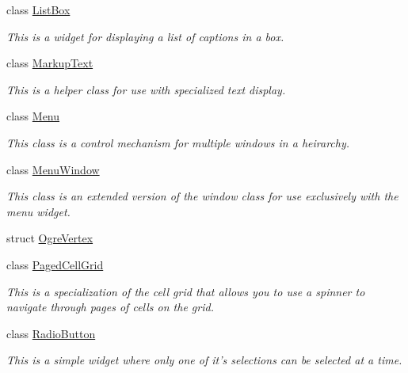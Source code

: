 \begin{DoxyCompactItemize}
class \hyperlink{classMezzanine_1_1UI_1_1ListBox}{ListBox}
\begin{DoxyCompactList}\small\item\em This is a widget for displaying a list of captions in a box. \item\end{DoxyCompactList}\item 
class \hyperlink{classMezzanine_1_1UI_1_1MarkupText}{MarkupText}
\begin{DoxyCompactList}\small\item\em This is a helper class for use with specialized text display. \item\end{DoxyCompactList}\item 
class \hyperlink{classMezzanine_1_1UI_1_1Menu}{Menu}
\begin{DoxyCompactList}\small\item\em This class is a control mechanism for multiple windows in a heirarchy. \item\end{DoxyCompactList}\item 
class \hyperlink{classMezzanine_1_1UI_1_1MenuWindow}{MenuWindow}
\begin{DoxyCompactList}\small\item\em This class is an extended version of the window class for use exclusively with the menu widget. \item\end{DoxyCompactList}\item 
struct \hyperlink{structMezzanine_1_1UI_1_1OgreVertex}{OgreVertex}
\item 
class \hyperlink{classMezzanine_1_1UI_1_1PagedCellGrid}{PagedCellGrid}
\begin{DoxyCompactList}\small\item\em This is a specialization of the cell grid that allows you to use a spinner to navigate through pages of cells on the grid. \item\end{DoxyCompactList}\item 
class \hyperlink{classMezzanine_1_1UI_1_1RadioButton}{RadioButton}
\begin{DoxyCompactList}\small\item\em This is a simple widget where only one of it's selections can be selected at a time. \item\end{DoxyCompactList}\item 

\end{DoxyCompactItemize}
